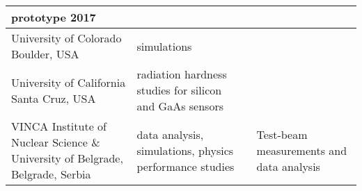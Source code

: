 \begin{landscape}
\begin{adjustbox}{max width=1.1\textwidth,totalheight=1\textheight}
\begin{tabularx}{1.1\textheight}{XXXX}
     prototype 2017 & \\
     \midrule
     University of Colorado Boulder, USA &
     simulations & & \\
     \midrule
     University of California Santa Cruz, USA &
     radiation hardness studies for silicon and GaAs sensors & & \\
     \midrule
     VINCA Institute of Nuclear Science \& University of Belgrade, Belgrade, Serbia &
     data analysis, simulations, physics performance studies &
     & Test-beam measurements and data analysis\\
    \bottomrule
\end{tabularx}
\end{adjustbox}
\end{landscape}
\restoregeometry

